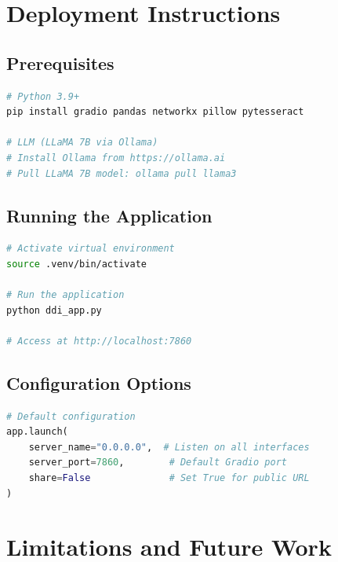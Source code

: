 \documentclass[11pt,a4paper]{article}
\begin{document}
\section{Deployment Instructions}

\subsection{Prerequisites}

\begin{lstlisting}[language=bash, caption=Required Dependencies]
# Python 3.9+
pip install gradio pandas networkx pillow pytesseract

# LLM (LLaMA 7B via Ollama)
# Install Ollama from https://ollama.ai
# Pull LLaMA 7B model: ollama pull llama3
\end{lstlisting}

\subsection{Running the Application}

\begin{lstlisting}[language=bash, caption=Application Launch]
# Activate virtual environment
source .venv/bin/activate

# Run the application
python ddi_app.py

# Access at http://localhost:7860
\end{lstlisting}

\subsection{Configuration Options}

\begin{lstlisting}[language=Python, caption=Launch Configuration]
# Default configuration
app.launch(
    server_name="0.0.0.0",  # Listen on all interfaces
    server_port=7860,        # Default Gradio port
    share=False              # Set True for public URL
)
\end{lstlisting}

\section{Limitations and Future Work}
\end{document}
